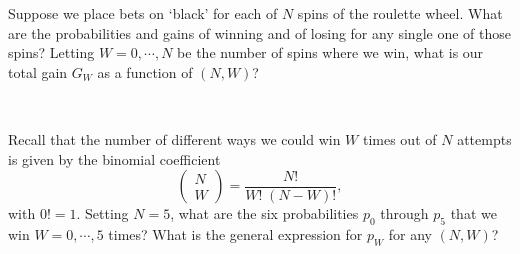 Suppose we place  bets on `black' for each of $N$ spins of the roulette wheel.
What are the probabilities and gains of winning and of losing for any single one of those spins?
Letting $W = 0, \cdots, N$ be the number of spins where we win, what is our total gain $G_W$ as a function of $(N, W)$?
\begin{mdframed}
  \ \\[100 pt]
\end{mdframed}
Recall that the number of different ways we could win $W$ times out of $N$ attempts is given by the binomial coefficient
\begin{equation*}
  \left(\begin{array}{c} N \\ W \end{array}\right) = \frac{N!}{W! \; (N - W)!},
\end{equation*}
with $0! = 1$.
Setting $N = 5$, what are the six probabilities $p_0$ through $p_5$ that we win $W = 0, \cdots, 5$ times?
What is the general expression for $p_W$ for any $(N, W)$?
\begin{mdframed}
  \ \\[100 pt]
\end{mdframed}


